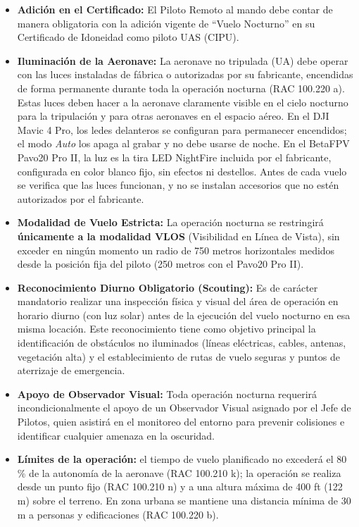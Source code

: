 \begin{itemize}
    \item \textbf{Adición en el Certificado:} El Piloto Remoto al mando debe contar de manera obligatoria con la adición vigente de ``Vuelo Nocturno'' en su Certificado de Idoneidad como piloto UAS (CIPU).
    \item \textbf{Iluminación de la Aeronave:} La aeronave no tripulada (UA) debe operar con las luces instaladas de fábrica o autorizadas por su fabricante, encendidas de forma permanente durante toda la operación nocturna (RAC 100.220 a). Estas luces deben hacer a la aeronave claramente visible en el cielo nocturno para la tripulación y para otras aeronaves en el espacio aéreo. En el DJI Mavic 4 Pro, los ledes delanteros se configuran para permanecer encendidos; el modo \textit{Auto} los apaga al grabar y no debe usarse de noche. En el BetaFPV Pavo20 Pro II, la luz es la tira LED NightFire incluida por el fabricante, configurada en color blanco fijo, sin efectos ni destellos. Antes de cada vuelo se verifica que las luces funcionan, y no se instalan accesorios que no estén autorizados por el fabricante.
    \item \textbf{Modalidad de Vuelo Estricta:} La operación nocturna se restringirá \textbf{únicamente a la modalidad VLOS} (Visibilidad en Línea de Vista), sin exceder en ningún momento un radio de 750 metros horizontales medidos desde la posición fija del piloto (250 metros con el Pavo20 Pro II).
    \item \textbf{Reconocimiento Diurno Obligatorio (Scouting):} Es de carácter mandatorio realizar una inspección física y visual del área de operación en horario diurno (con luz solar) antes de la ejecución del vuelo nocturno en esa misma locación. Este reconocimiento tiene como objetivo principal la identificación de obstáculos no iluminados (líneas eléctricas, cables, antenas, vegetación alta) y el establecimiento de rutas de vuelo seguras y puntos de aterrizaje de emergencia.
    \item \textbf{Apoyo de Observador Visual:} Toda operación nocturna requerirá incondicionalmente el apoyo de un Observador Visual asignado por el Jefe de Pilotos, quien asistirá en el monitoreo del entorno para prevenir colisiones e identificar cualquier amenaza en la oscuridad.
    \item \textbf{Límites de la operación:} el tiempo de vuelo planificado no excederá el 80\,\% de la autonomía de la aeronave (RAC 100.210 k); la operación se realiza desde un punto fijo (RAC 100.210 n) y a una altura máxima de 400 ft (122 m) sobre el terreno. En zona urbana se mantiene una distancia mínima de 30 m a personas y edificaciones (RAC 100.220 b).

\end{itemize}
